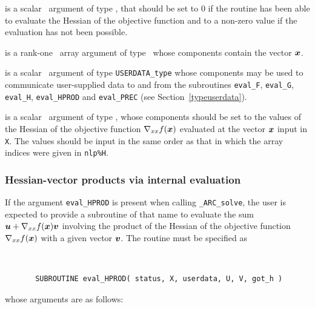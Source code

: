 \documentclass{galahad}
\newcommand{\packagename}{ARC}
\newcommand{\fullpackagename}{\libraryname\_\packagename}
\newcommand{\solver}{{\tt \fullpackagename\_solve}}
\begin{document}
\begin{description}
 is a scalar \intentout\ argument of type \integer,
that should be set to 0 if the routine has been able to evaluate
the Hessian of the objective function
and to a non-zero value if the evaluation has not been possible.

 is a rank-one \intentin\ array argument of type \realdp\
whose components contain the vector ${\bm{x}}$.

 is a scalar \intentinout\ argument of type
{\tt USERDATA\_type} whose components may be used
to communicate user-supplied data to and from the
subroutines {\tt eval\_F}, {\tt eval\_G},
{\tt eval\_H}, {\tt eval\_HPROD} and {\tt eval\_PREC}
(see Section~\ref{typeuserdata}).

 is a scalar \intentout\ argument of type \realdp,
whose components should be set to the values of the Hessian
of the objective function $\nabla_{xx} f({\bm{x}})$
evaluated at the vector ${\bm{x}}$ input in {\tt X}. The values should
be input in the same order as that in which the array indices were
given in {\tt nlp\%H}.

\end{description}


\subsubsection{Hessian-vector products via internal evaluation\label{hvfv}}

If the argument {\tt eval\_HPROD} is present when calling \solver, the
user is expected to provide a subroutine of that name to evaluate the
sum ${\bm{u}} + \nabla_{xx} f({\bm{x}}) {\bm{v}}$ involving the
product of the Hessian of the objective function $\nabla_{xx} f({\bm{x}})$
with a given vector ${\bm{v}}$.
The routine must be specified as

\def\baselinestretch{0.8}
{\tt
\begin{verbatim}
       SUBROUTINE eval_HPROD( status, X, userdata, U, V, got_h )
\end{verbatim} }
\def\baselinestretch{1.0}
\noindent whose arguments are as follows:
\end{document}

